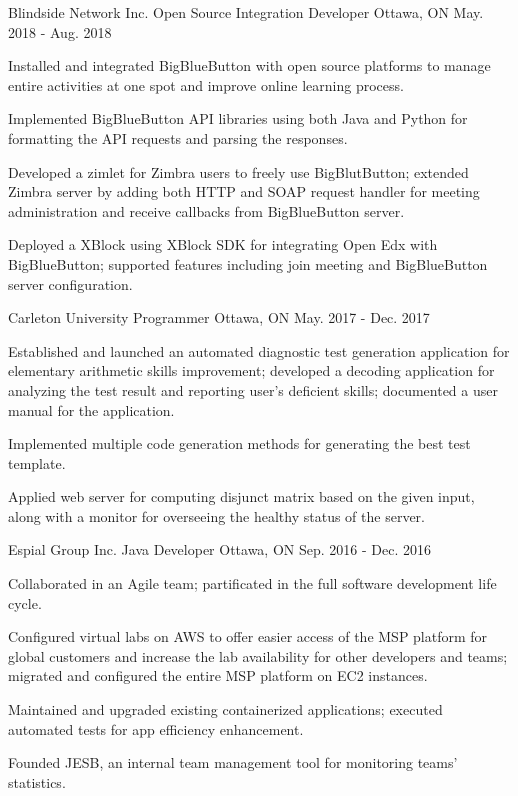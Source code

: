 \begin{cventries}

\cventry
{Blindside Network Inc.}
{Open Source Integration Developer}
{Ottawa, ON}
{May. 2018 - Aug. 2018}
{\begin{cvitems}
    \item {Installed and integrated BigBlueButton with open source platforms to manage entire activities at one spot and improve online learning process.}
    \item {Implemented BigBlueButton API libraries using both Java and Python for formatting the API requests and parsing the responses.}
    \item {Developed a zimlet for Zimbra users to freely use BigBlutButton; extended Zimbra server by adding both HTTP and SOAP request handler for meeting administration and receive callbacks from BigBlueButton server.}
    \item {Deployed a XBlock using XBlock SDK for integrating Open Edx with BigBlueButton; supported features including join meeting and BigBlueButton server configuration.}
\end{cvitems}}

\cventry
{Carleton University}
{Programmer}
{Ottawa, ON}
{May. 2017 - Dec. 2017}
{\begin{cvitems}
    \item {Established and launched an automated diagnostic test generation application for elementary arithmetic skills improvement; developed a decoding application for analyzing the test result and reporting user's deficient skills; documented a user manual for the application.}
    \item {Implemented multiple code generation methods for generating the best test template.}
    \item {Applied web server for computing disjunct matrix based on the given input, along with a monitor for overseeing the healthy status of the server.}
\end{cvitems}}

\cventry
{Espial Group Inc.}
{Java Developer}
{Ottawa, ON}
{Sep. 2016 - Dec. 2016}
{\begin{cvitems}
    \item {Collaborated in an Agile team; partificated in the full software development life cycle.}
    \item {Configured virtual labs on AWS to offer easier access of the MSP platform for global customers and increase the lab availability for other developers and teams; migrated and configured the entire MSP platform on EC2 instances.}
    \item {Maintained and upgraded existing containerized applications; executed automated tests for app efficiency enhancement.}
    \item {Founded JESB, an internal team management tool for monitoring teams' statistics.}
\end{cvitems}}


\end{cventries}
